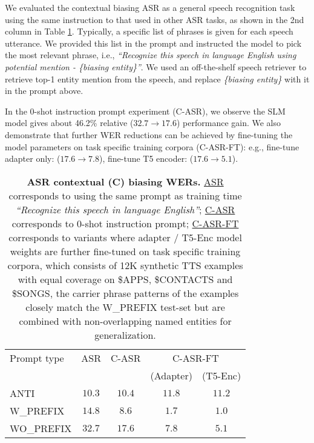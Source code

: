 We evaluated the contextual biasing ASR as a general speech recognition task using the same instruction to that used in other ASR tasks, as shown in the 2nd column in Table \ref{tab:biasing_results}. Typically, a specific list of phrases is given for each speech utterance. We provided this list in the prompt and instructed the model to pick the most relevant phrase, i.e., {\em ``Recognize this speech in language English using potential mention - \{biasing entity\}''}. 
We used an off-the-shelf speech retriever \cite{wang2023speech} to retrieve top-1 entity mention from the speech, and replace {\em \{biasing entity\}} with it in the prompt above.

In the 0-shot instruction prompt experiment (C-ASR), we observe the SLM model gives about 46.2\% relative ($32.7 \rightarrow 17.6$) performance gain. We also demonstrate that further WER reductions can be achieved by fine-tuning the model parameters on task specific training corpora (C-ASR-FT): e.g., fine-tune adapter only: ($17.6 \rightarrow 7.8$), fine-tune T5 encoder: ($17.6 \rightarrow 5.1$).  

\begin{table}[h]
    \centering
    
    \begin{tabular}{lcccc} 
    \toprule

        Prompt type          & ASR  & C-ASR & \multicolumn{2}{c}{C-ASR-FT} \\
                  &   &  & (Adapter) & (T5-Enc) \\
            \midrule
\midrule
        ANTI       &  $10.3$& $10.4$ & $11.8$ & $11.2$ \\
        W\_PREFIX  &  $14.8$& $8.6$ & $1.7$ & $1.0$ \\
        WO\_PREFIX &  $32.7$& $17.6$ &  $7.8$ & $5.1$\\ 
            \bottomrule

    \end{tabular}
    \caption{\textbf{ASR contextual (C) biasing WERs.} \underline{ASR} corresponds to using the same prompt as training time {\em ``Recognize this speech in language English''}; \underline{C-ASR} corresponds to 0-shot instruction prompt; \underline{C-ASR-FT} corresponds to variants where adapter / T5-Enc model weights are further fine-tuned on task specific training corpora, which consists of 12K synthetic TTS examples with equal coverage on \$APPS, \$CONTACTS and \$SONGS, the carrier phrase patterns of the examples closely match the W\_PREFIX test-set but are combined with non-overlapping named entities for generalization.}
    \label{tab:biasing_results}
\vspace{-.2in}
    
\end{table}


